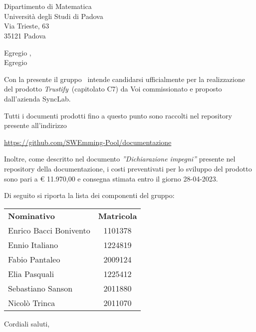 \documentclass[12pt, boldsubject, italicsignature, noindent]{letteracdp}
\date{}
\renewcommand{\capName}{\textit{Trustify}} %
\renewcommand{\capCode}{C7} %
\renewcommand{\capProposer}{SyncLab} %
\begin{document}
\begin{letter}{
    \Vardanega \\
    \Cardin \\
    Dipartimento di Matematica \\
    Università degli Studi di Padova \\
    Via Trieste, 63 \\ 35121 Padova
}

\opening{Egregio \vardanega,\\ Egregio \cardin}

Con la presente il gruppo \groupName\ intende candidarsi ufficialmente per la realizzazione del prodotto \capName\ (capitolato \capCode) da Voi commissionato e proposto dall'azienda \capProposer.

Tutti i documenti prodotti fino a questo punto sono raccolti nel repository presente all'indirizzo 
\begin{center}
    \url{https://github.com/SWEmming-Pool/documentazione}
\end{center}

Inoltre, come descritto nel documento \textit{''Dichiarazione impegni''} presente nel repository della documentazione, i costi preventivati per lo sviluppo del prodotto sono pari a \euro{} 11.970,00 e consegna stimata entro il giorno 28-04-2023.

\pagebreak

Di seguito si riporta la lista dei componenti del gruppo:

\begin{center}
    \begin{tabular}{l|c}
    \textbf{Nominativo} & \textbf{Matricola} \\
    Enrico Bacci Bonivento & 1101378 \\
	Ennio Italiano & 1224819 \\
	Fabio Pantaleo & 2009124 \\     
	Elia Pasquali & 1225412 \\	     
	Sebastiano Sanson & 2011880 \\
    Nicolò Trinca & 2011070
   \end{tabular}
\end{center}

\closing{Cordiali saluti,}

\end{letter}
\end{document}

